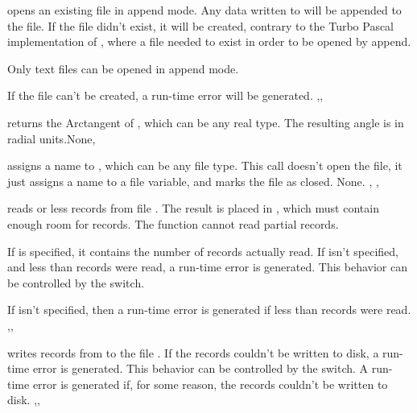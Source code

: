 \documentclass{report}
\begin{document}


{ opens an existing file in append mode. Any data written to
 will be appended to the file. If the file didn't exist, it will be
created, contrary to the Turbo Pascal implementation of , where
a file needed to exist in order to be opened by
append.

Only text files can be opened in append mode.
}
{If the file can't be created, a run-time error will be generated.}
{,, }



{ returns the Arctangent of , which can be any real type.
The resulting angle is in radial units.}{None}{, }



{ assigns a name to , which can be any file type.
This call doesn't open the file, it just assigns a name to a file variable,
and marks the file as closed.}
{None.}
{, , }



{ reads  or less records from file . The
result is placed in , which must contain enough room for
 records. The function cannot read partial records. 

If  is specified, it contains the number of records actually
read. If  isn't specified, and less than  records were
read, a run-time error is generated. This behavior can be controlled by the
 switch. }
{If  isn't specified, then a run-time error is generated if less
than  records were read.}
{,, }



{ writes  records from  to the file
 . 
If the records couldn't be written to disk, a run-time error is generated.
This behavior can be controlled by the  switch. 
}
{A run-time error is generated if, for some reason, the records couldn't be
written to disk.}
{,, }
\end{document}
